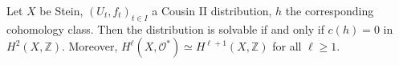 Let $X$ be Stein, $(U_t, f_t)_{t \in I}$ a Cousin II distribution, $h$ the corresponding cohomology class. Then the distribution is solvable if and only if $c(h) = 0$ in $H^2(X, \mathbb{Z})$. Moreover, $H^\ell(X, \mathcal{O}^*) \simeq H^{\ell+1}(X, \mathbb{Z})$ for all $\ell \geqslant 1$.
